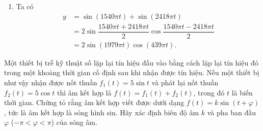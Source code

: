 \begin{bt}
{\begin{enumerate}
			Khi đó $y=\sin \left(2 \pi 770 t\right)+\sin \left(2 \pi 1209 t\right)$.\\
			Hay $y=\sin \left(1540 \pi  t\right)+\sin \left(2418 \pi  t\right)$.	
			\item  Ta có 
			\[
			\begin{aligned}
				y&=\sin \left(1540 \pi t\right)+\sin \left(2418 \pi t\right)\\
				&= 2\sin \dfrac{1540 \pi t+2418 \pi t}{2}\cos \dfrac{1540 \pi t-2418 \pi t}{2}\\
				&=2\sin(1979 \pi t)\cos (439 \pi t). 
			\end{aligned}\]
		\end{enumerate}
	}
\end{bt}

\begin{bt}%
	Một thiết bị trễ kỹ thuật số lặp lại tín hiệu đầu vào bằng cách lặp lại tín hiệu đó trong một khoảng thời gian cố định sau khi nhận được tín hiệu. Nếu một thiết bị như vậy nhận được nốt thuần $f_1(t) = 5\sin t$ và phát lại nốt thuần $f_2(t) = 5\cos t$ thì âm kết hợp là $f(t)=f_1(t)+f_2(t)$, trong đó $t$ là biến thời gian. Chứng tỏ rằng âm kết hợp viết được dưới dạng $f(t) = k\sin(t+\varphi)$, tức là âm kết hợp là sóng hình sin. Hãy xác định biên độ âm $k$ và pha ban đầu $\varphi$ ($-\pi < \varphi <\pi$) của sóng âm.
\end{bt}

